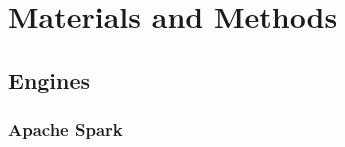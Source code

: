 \documentclass{IEEEtran}
\begin{document}









\section{Materials and Methods} %


\subsection{Engines} %

\subsubsection{Apache Spark}


\end{document}
